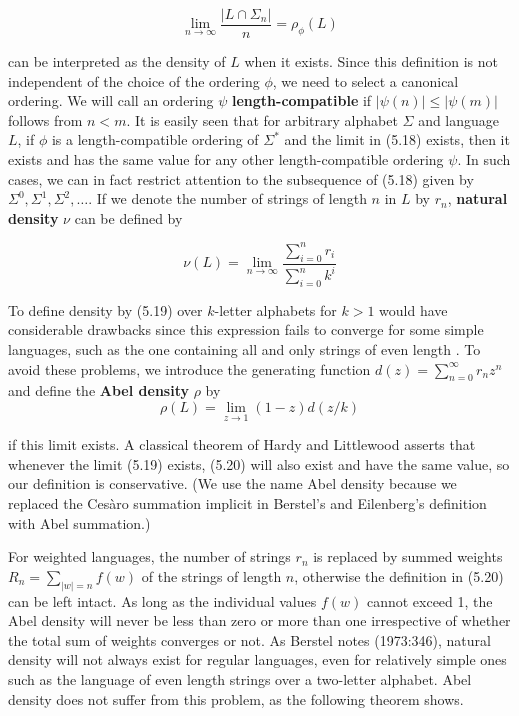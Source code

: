 \begin{equation}
\lim_{n \rightarrow \infty} \frac{| L \cap \Sigma_n |}{n} = \rho_{\phi}(L)
\end{equation}

\noindent
can be interpreted as the density of $L$ when it exists. Since this definition
is not independent of the choice of the ordering $\phi$, we need to select a
canonical ordering. We will call an ordering $\psi$ {\bf length-compatible} if
$|\psi(n)| \leq |\psi(m)|$ follows from $n<m$. It is easily seen that for
arbitrary alphabet $\Sigma$ and language $L$, if $\phi$ is a length-compatible
ordering of $\Sigma^*$ and the limit in (5.18) exists, then it exists and has
the same value for any other length-compatible ordering $\psi$. In such cases,
we can in fact restrict attention to the subsequence of (5.18) given by
$\Sigma^0, \Sigma^1, \Sigma^2, \ldots$. If we denote the number of strings of
length $n$ in $L$ by $r_n$, {\bf natural density} $\nu$ can be defined by

\begin{equation}
\nu(L) = \lim_{n \rightarrow \infty} \frac{\sum_{i=0}^n r_i}{\sum_{i=0}^n k^i}
\end{equation}

\smallskip
\noindent
To define density by (5.19) over $k$-letter alphabets for $k > 1$ would have
considerable drawbacks since this expression fails to converge for some simple
languages, such as the one containing all and only strings of even length
\cite{Berstel:1973}. To avoid these problems, we introduce the generating
function $d(z)=\sum_{n=0}^{\infty}r_nz^n$ and define the {\bf Abel density}
$\rho$ by 
\begin{equation} 
\rho(L) = \lim_{z \rightarrow 1} (1-z)d(z/k)
\end{equation} 

\smallskip
\noindent
if this limit exists.  A classical theorem of Hardy
and Littlewood asserts that whenever the limit (5.19) exists, (5.20) will also
exist and have the same value, so our definition is conservative. (We use the
name Abel density because we replaced the Ces\`aro summation implicit in
Berstel's and Eilenberg's definition with Abel summation.)

For weighted languages, the number of strings $r_n$ is replaced by summed
weights $R_n = \sum_{|w|=n} f(w)$ of the strings of length $n$, otherwise the
definition in (5.20) can be left intact. As long as the individual values
$f(w)$ cannot exceed 1, the Abel density will never be less than zero or more
than one irrespective of whether the total sum of weights converges or not.
As Berstel notes (1973:346), natural density will not always exist for regular
languages, even for relatively simple ones such as the language of even
length strings over a two-letter alphabet. Abel density does not suffer from
this problem, as the following theorem shows. 

